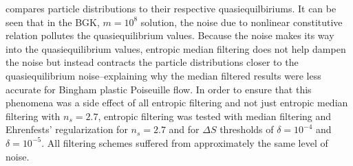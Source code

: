 \documentclass[pdftex,ms]{pittetd}
\begin{document}
 compares particle distributions to their respective quasiequilbiriums.
It can be seen that in the BGK, $m = 10^8$ solution, the noise due to nonlinear constitutive relation pollutes the quasiequilibrium values.
Because the noise makes its way into the quasiequilibrium values, entropic median filtering does not help dampen the noise but instead contracts the particle distributions closer to the quasiequilibrium noise--explaining why the median filtered results were less accurate for Bingham plastic Poiseuille flow.
In order to ensure that this phenomena was a side effect of all entropic filtering and not just entropic median filtering with $n_s = 2.7$, entropic filtering was tested with median filtering and Ehrenfests' regularization for $n_s = 2.7$ and for $\Delta S$ thresholds of $\delta = 10^{-4}$ and $\delta = 10^{-5}$.
All filtering schemes suffered from approximately the same level of noise.
\end{document}
